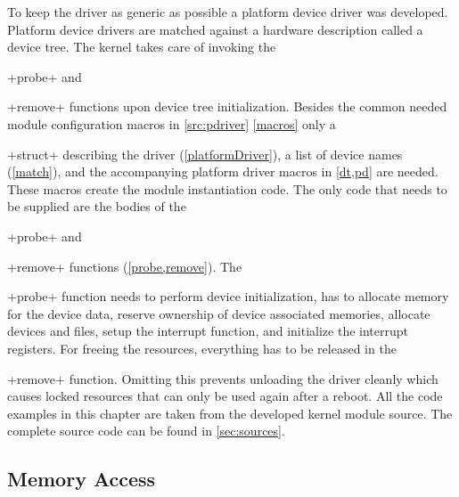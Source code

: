 \documentclass[12pt,a4paper,parskip=full,abstract=true,BCOR=12mm]{scrreprt}
\newcommand*{\SavedLstInline}{}
\DeclareRobustCommand*{\lstinline}{%
  \ifmmode
    \let\SavedBGroup\bgroup
    \def\bgroup{%
      \let\bgroup\SavedBGroup
      \hbox\bgroup
    }%
  \fi
  \SavedLstInline
}
\begin{document}
To keep the driver as generic as possible a platform device driver\cite{platform_device} was
developed. Platform device drivers are matched against a hardware description
called a device tree\cite{platform_device}. The kernel takes care of
invoking the \lstinline+probe+ and \lstinline+remove+ functions upon device tree initialization. Besides
the common needed module configuration macros in \cref{src:pdriver} \cref{macros} only a
\lstinline+struct+ describing the driver (\cref{platformDriver}),
a list of device names (\cref{match}), and the accompanying platform
driver macros in \cref{dt,pd} are needed. These macros create the module
instantiation code. The only code that needs to be supplied are the bodies of
the \lstinline+probe+ and \lstinline+remove+ functions (\cref{probe,remove}). The \lstinline+probe+ function
needs to perform device initialization, has to allocate memory for the
device data, reserve ownership of device associated memories, allocate
devices and files, setup the interrupt function, and initialize the
interrupt registers. For freeing the resources, everything has to be
released in the \lstinline+remove+ function. Omitting this prevents unloading the driver cleanly which
causes locked resources that can only be used again after a reboot.
All the code examples in this chapter are taken from the developed kernel module source. The
complete source code can be found in \cref{sec:sources}.


\subsection{Memory Access}
\label{sec:memory_access}
\end{document}
